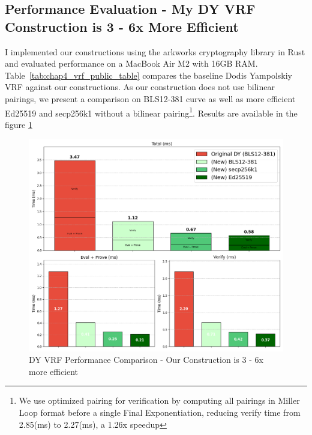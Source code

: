\subsection{Performance Evaluation - My DY VRF Construction is 3 - 6x More Efficient}

I implemented our constructions \cite{polgar_anonymous_2025} using the arkworks cryptography library \cite{arkworks_contributors_arkworks_2022} in Rust and evaluated performance on a MacBook Air M2 with 16GB RAM. Table~\ref{tab:chap4_vrf_public_table} compares the baseline Dodis Yampolskiy VRF against our constructions. As our construction does not use bilinear pairings, we present a comparison on BLS12-381 curve as well as more efficient Ed25519 and secp256k1 without a bilinear pairing\footnote{We use optimized pairing for verification by computing all pairings in Miller Loop format before a single Final Exponentiation, reducing verify time from 2.85(ms) to 2.27(ms), a 1.26x speedup}. Results are available in the figure \ref{fig:chap4_public_vrf}

\begin{figure}[!htb]
    \centering
    \includegraphics[width=1\linewidth]{figures/chap4_dy_comparisons.png}
        \caption[Our DY VRF Construction is 3 - 6x more efficient]{DY VRF Performance Comparison - Our Construction is 3 - 6x more efficient}
    \label{fig:chap4_public_vrf}
\end{figure}

